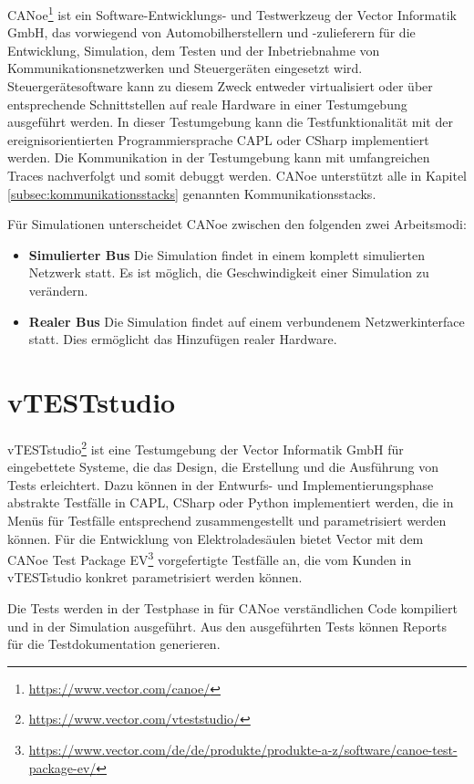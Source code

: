 CANoe\footnote{\url{https://www.vector.com/canoe/}} ist ein Software-Entwicklungs- und Testwerkzeug der Vector Informatik GmbH, das vorwiegend von Automobilherstellern und -zulieferern für die Entwicklung, Simulation, dem Testen und der Inbetriebnahme von Kommunikationsnetzwerken und Steuergeräten eingesetzt wird. Steuergerätesoftware kann zu diesem Zweck entweder virtualisiert oder über entsprechende Schnittstellen auf reale Hardware in einer Testumgebung ausgeführt werden. In dieser Testumgebung kann die Testfunktionalität mit der ereignisorientierten Programmiersprache CAPL oder CSharp implementiert werden. Die Kommunikation in der Testumgebung kann mit umfangreichen Traces nachverfolgt und somit debuggt werden. CANoe unterstützt alle in Kapitel \ref{subsec:kommunikationsstacks} genannten Kommunikationsstacks. 

Für Simulationen unterscheidet CANoe zwischen den folgenden zwei Arbeitsmodi:
\begin{itemize}
\item \textbf{Simulierter Bus} Die Simulation findet in einem komplett simulierten Netzwerk statt. Es ist möglich, die Geschwindigkeit einer Simulation zu verändern.
\item \textbf{Realer Bus} Die Simulation findet auf einem verbundenem Netzwerkinterface statt. Dies ermöglicht das Hinzufügen realer Hardware.
\end{itemize}

\cite[]{simulatingcanoe}

\section{vTESTstudio}\label{subsec:vteststudio}

vTESTstudio\footnote{\url{https://www.vector.com/vteststudio/}} ist eine Testumgebung der Vector Informatik GmbH für eingebettete Systeme, die das Design, die Erstellung und die Ausführung von Tests erleichtert. Dazu können in der Entwurfs- und Implementierungsphase abstrakte Testfälle in CAPL, CSharp oder Python implementiert werden, die in Menüs für Testfälle entsprechend zusammengestellt und parametrisiert werden können. Für die Entwicklung von Elektroladesäulen bietet Vector mit dem CANoe Test Package EV\footnote{\url{https://www.vector.com/de/de/produkte/produkte-a-z/software/canoe-test-package-ev/}} vorgefertigte Testfälle an, die vom Kunden in vTESTstudio konkret parametrisiert werden können. 

Die Tests werden in der Testphase in für CANoe verständlichen Code kompiliert und in der Simulation ausgeführt. Aus den ausgeführten Tests können Reports für die Testdokumentation generieren. 

